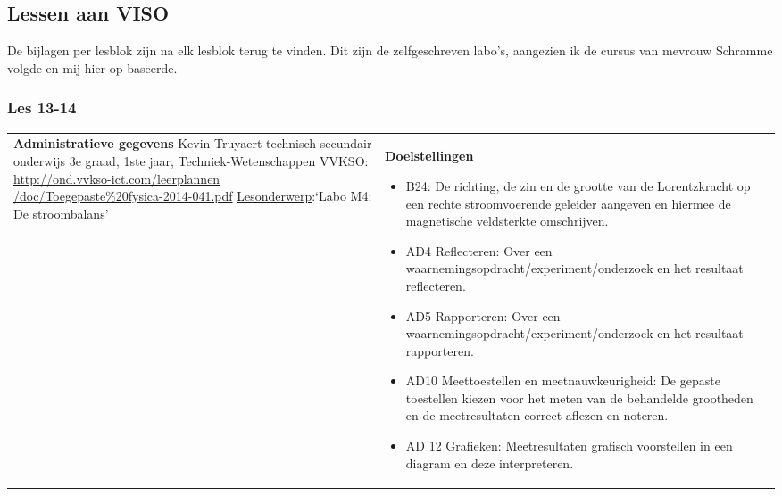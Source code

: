 


\begin{landscape}
	\subsection{Lessen aan VISO}\vspace*{-5mm}
	De bijlagen per lesblok zijn na elk lesblok terug te vinden. Dit zijn de zelfgeschreven labo's, aangezien ik de cursus van mevrouw Schramme volgde en mij hier op baseerde. \vspace*{-15mm}
	\subsubsection{Les 13-14}\vspace*{-5mm}
	\begin{tabularx}{1.56\textwidth}{|p{}|X|}\hline
		\textbf{Administratieve gegevens}\newline\newline
		Kevin Truyaert\newline\newline
		technisch secundair onderwijs\newline
		3e graad, 1ste jaar, Techniek-Wetenschappen\newline
		VVKSO: \href{http://ond.vvkso-ict.com/leerplannen/doc/Toegepaste\%20fysica-2014-041.pdf}{http://ond.vvkso-ict.com/leerplannen /doc/Toegepaste\%20fysica-2014-041.pdf} \newline
		\underline{Lesonderwerp}:\newline `Labo M4: De stroombalans' & \textbf{Doelstellingen}
		\begin{itemize}[itemsep=0.08\baselineskip]
			\item B24: De richting, de zin en de grootte van de Lorentzkracht op een rechte stroomvoerende geleider aangeven en hiermee de magnetische veldsterkte omschrijven. 
			\item AD4 Reflecteren: Over een waarnemingsopdracht/experiment/onderzoek en het resultaat reflecteren.
			\item AD5 Rapporteren: Over een waarnemingsopdracht/experiment/onderzoek en het resultaat rapporteren.
			\item AD10 Meettoestellen en meetnauwkeurigheid: De gepaste toestellen kiezen voor het meten van de behandelde grootheden en de meetresultaten correct aflezen en noteren.
			\item AD 12 Grafieken: Meetresultaten grafisch voorstellen in een diagram en deze interpreteren.

\end{itemize}
\end{tabularx}
\end{landscape}
